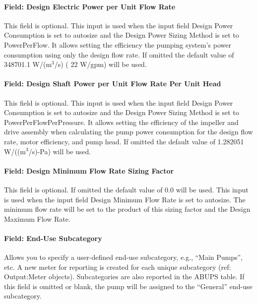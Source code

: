 \paragraph{Field: Design Electric Power per Unit Flow Rate}\label{field-design-electric-power-per-unit-flow-rate}

This field is optional. This input is used when the input field Design Power Consumption is set to autosize and the Design Power Sizing Method is set to PowerPerFlow. It allows setting the efficiency the pumping system's power consumption using only the design flow rate. If omitted the default value of 348701.1 W/(m\(^{3}\)/s) ( 22 W/gpm) will be used.

\paragraph{Field: Design Shaft Power per Unit Flow Rate Per Unit Head}\label{field-design-shaft-power-per-unit-flow-rate-per-unit-head}

This field is optional. This input is used when the input field Design Power Consumption is set to autosize and the Design Power Sizing Method is set to PowerPerFlowPerPressure. It allows setting the efficiency of the impeller and drive assembly when calculating the pump power consumption for the design flow rate, motor efficiency, and pump head. If omitted the default value of 1.282051 W/((m\(^{3}\)/s)-Pa) will be used.

\paragraph{Field: Design Minimum Flow Rate Sizing Factor}\label{field-design-minimum-flow-rate-sizing-factor}

This field is optional. If omitted the default value of 0.0 will be used. This input is used when the input field Design Minimum Flow Rate is set to autosize. The minimum flow rate will be set to the product of this sizing factor and the Design Maximum Flow Rate.

\paragraph{Field: End-Use Subcategory}\label{field-end-use-subcategory-1-000}

Allows you to specify a user-defined end-use subcategory, e.g., ``Main Pumps'', etc. A new meter for reporting is created for each unique subcategory (ref: Output:Meter objects). Subcategories are also reported in the ABUPS table. If this field is omitted or blank, the pump will be assigned to the ``General'' end-use subcategory.

